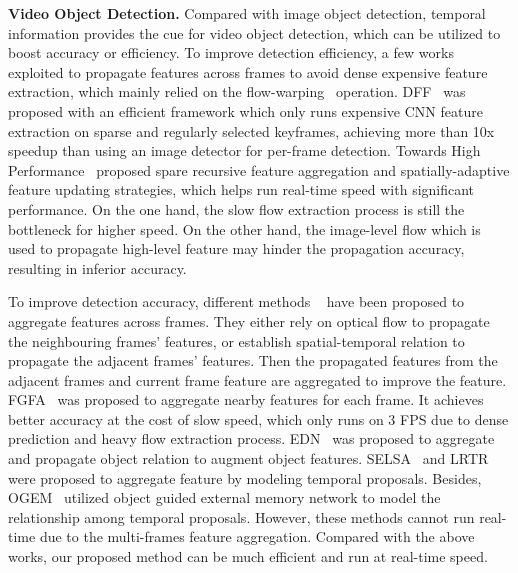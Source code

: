 \documentclass[runningheads]{llncs}
\begin{document}
\noindent \textbf{Video Object Detection.}
Compared with image object detection, temporal information provides the cue for video object detection, which can be utilized to boost accuracy or efficiency. To improve detection efficiency, a few works~\cite{zhu2017deep, hetang2017impression} exploited to propagate features across frames to avoid dense expensive feature extraction, which mainly relied on the flow-warping~\cite{zhu2017deep} operation. DFF~\cite{zhu2017deep} was proposed with an efficient framework which only runs expensive CNN feature extraction on sparse and regularly selected keyframes, achieving more than 10x speedup than using an image detector for per-frame detection. Towards High Performance~\cite{zhu2018towards} proposed spare recursive feature aggregation and spatially-adaptive feature updating strategies, which helps run real-time speed with significant performance. On the one hand, the slow flow extraction process is still the bottleneck for higher speed. On the other hand, the image-level flow which is used to propagate high-level feature may hinder the propagation accuracy, resulting in inferior accuracy.

To improve detection accuracy, different methods ~\cite{zhu2017flow,shvets2019leveraging,wu2019sequence,deng2019object} have been proposed to aggregate features across frames. They either rely on optical flow to propagate the neighbouring frames' features, or establish spatial-temporal relation to propagate the adjacent frames' features. Then the propagated features from the adjacent frames and current frame feature are aggregated to improve the feature. FGFA~\cite{zhu2017flow} was proposed to aggregate nearby features for each frame. It achieves better accuracy at the cost of slow speed, which only runs on 3 FPS due to dense prediction and heavy flow extraction process. EDN~\cite{deng2019relation} was proposed to aggregate and propagate object
relation to augment object features. SELSA~\cite{wu2019sequence} and LRTR~\cite{shvets2019leveraging} were proposed to aggregate feature by modeling temporal proposals. Besides, OGEM~\cite{deng2019object} utilized object guided external memory network to model the relationship among temporal proposals. However, these methods cannot run real-time due to the multi-frames feature aggregation. Compared with the above works, our proposed method can be much efficient and run at real-time speed.
\end{document}
